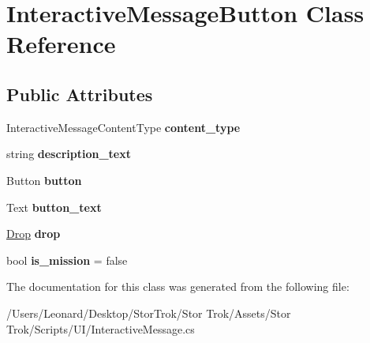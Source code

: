 \hypertarget{class_interactive_message_button}{}\section{Interactive\+Message\+Button Class Reference}
\label{class_interactive_message_button}
\subsection*{Public Attributes}
\begin{DoxyCompactItemize}
\item 
\mbox{\label{class_interactive_message_button_acff0bcb6a248f2328cd6fe94eb11879c}} 
Interactive\+Message\+Content\+Type {\bfseries content\+\_\+type}
\item 
\mbox{\label{class_interactive_message_button_a8148af4974fa552f7f7a9bf99a782814}} 
string {\bfseries description\+\_\+text}
\item 
\mbox{\label{class_interactive_message_button_a4824df2f4f364ca8c6e1d252e15bb421}} 
Button {\bfseries button}
\item 
\mbox{\label{class_interactive_message_button_acbe1c2b46e1c7cfa13da6dfb99691942}} 
Text {\bfseries button\+\_\+text}
\item 
\mbox{\label{class_interactive_message_button_a78e912d4a9ab380f32b25d4e072d8946}} 
\hyperlink{class_drop}{Drop} {\bfseries drop}
\item 
\mbox{\label{class_interactive_message_button_afa150ab79d07570f62e1d46a3df3ba8d}} 
bool {\bfseries is\+\_\+mission} = false
\end{DoxyCompactItemize}


The documentation for this class was generated from the following file\+:\begin{DoxyCompactItemize}
\item 
/\+Users/\+Leonard/\+Desktop/\+Stor\+Trok/\+Stor Trok/\+Assets/\+Stor Trok/\+Scripts/\+U\+I/Interactive\+Message.\+cs\end{DoxyCompactItemize}
